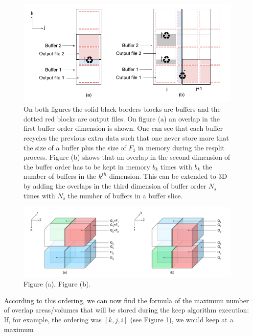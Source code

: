 \documentclass[conference]{IEEEtran}
\begin{document}
\begin{figure}[h]
\centering
\includegraphics[scale=0.45]{./figures/new/naive_buffer_order.png}
\caption{On both figures the solid black borders blocks are buffers and the dotted red blocks are output files. On figure (a) an overlap in the first buffer order dimension is shown. One can see that each buffer recycles the previous extra data such that one never store more that the size of a buffer plus the size of $F_1$ in memory during the resplit process. Figure (b) shows that an overlap in the second dimension of the buffer order has to be kept in memory $b_k$ times with $b_k$ the number of buffers in the $k^{th}$ dimension. This can be extended to 3D by adding the overlaps in the third dimension of buffer order $N_s$ times with $N_s$ the number of buffers in a buffer slice.
}
\label{fig:naive_buffer_order}
\end{figure}

\begin{figure}[h]
\centering
\includegraphics[scale=0.45]{./figures/new/g_s.png}
\caption{Figure (a).  Figure (b).
}
\label{fig:g_s}
\end{figure}

According to this ordering, we can now find the formula of the maximum number of overlap areas/volumes that will be stored during the keep algorithm execution:
If, for example, the ordering was $[k,j,i]$ (see Figure \ref{fig:naive_buffer_order}), we would keep at a maximum
\end{document}
